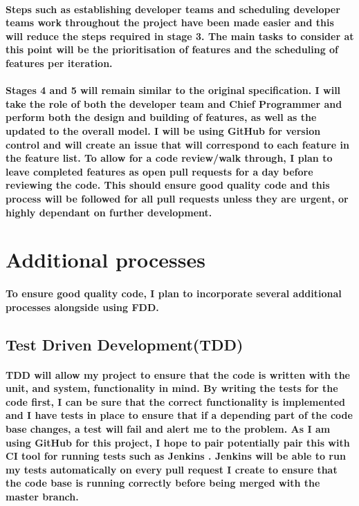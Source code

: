 \documentclass{article}
\begin{document}
\paragraph{Steps such as establishing developer teams and scheduling developer teams work throughout the project have been made easier and this will reduce the steps required in stage 3. The main tasks to consider at this point will be the prioritisation of features and the scheduling of features per iteration.}

\paragraph{Stages 4 and 5  will remain similar to the original specification. I will take the role of both the developer team and Chief Programmer and perform both the design and building of features, as well as the updated to the overall model. I will be using GitHub for version control and will create an issue that will correspond to each feature in the feature list. To allow for a code review/walk through, I plan to leave completed features as open pull requests for a day before reviewing the code. This should ensure good quality code and this process will be followed for all pull requests unless they are urgent, or highly dependant on further development.}

\newpage

\section{Additional processes}
\paragraph{To ensure good quality code, I plan to incorporate several additional processes alongside using FDD.}

\subsection{Test Driven Development(TDD)}
\paragraph{TDD will allow my project to ensure that the code is written with the unit, and system, functionality in mind. By writing the tests for the code first, I can be sure that the correct functionality is implemented and I have tests in place to ensure that if a depending part of the code base changes, a test will fail and alert me to the problem. As I am using GitHub for this project, I hope to pair potentially pair this with CI tool for running tests such as Jenkins \cite{jenkins}. Jenkins will be able to run my tests automatically on every pull request I create to ensure that the code base is running correctly before being merged with the master branch. 
}
\end{document}
